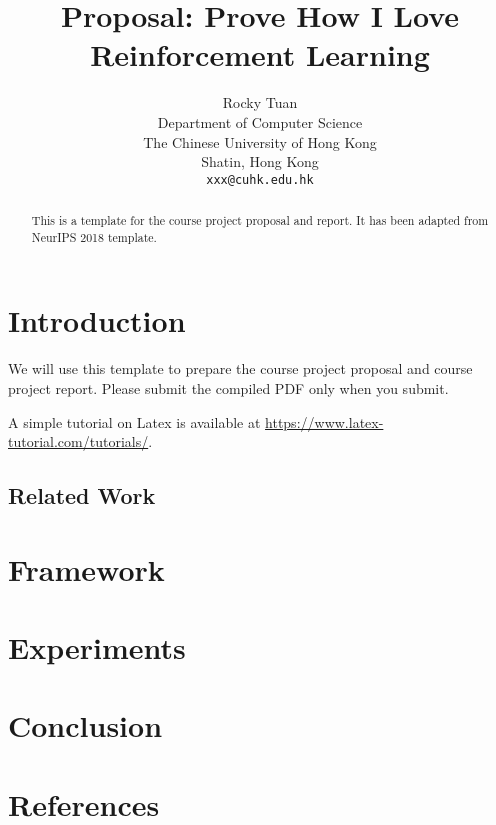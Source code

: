 \documentclass{article}
\title{Proposal: Prove How I Love Reinforcement Learning}
\author{%
  Rocky Tuan \\
  Department of Computer Science\\
  The Chinese University of Hong Kong\\
  Shatin, Hong Kong \\
  \texttt{xxx@cuhk.edu.hk} \\
}
\begin{document}

\maketitle

\begin{abstract}
This is a template for the course project proposal and report. It has been adapted from NeurIPS 2018 template. 
\end{abstract}

\section{Introduction}

We will use this template to prepare the course project proposal and course project report. Please submit the compiled PDF only when you submit. 

A simple tutorial on Latex is available at \url{https://www.latex-tutorial.com/tutorials/}.


\subsection{Related Work}


\section{Framework}


\section{Experiments}



\section{Conclusion}





\section*{References}

\medskip

{\small


}
\end{document}

